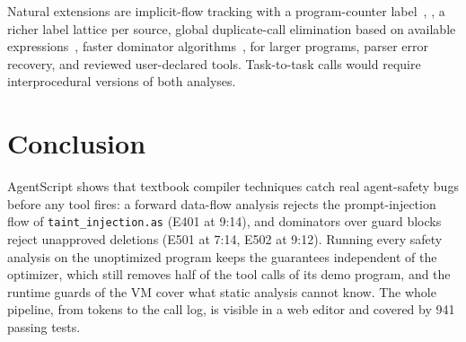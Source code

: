 \documentclass[conference]{IEEEtran}
\begin{document}
Natural extensions are implicit-flow tracking with a program-counter label~\cite{denning}, \cite{sabelfeld}, a richer label lattice per source, global duplicate-call elimination based on available expressions~\cite{aho}, faster dominator algorithms~\cite{lt}, \cite{cooper} for larger programs, parser error recovery, and reviewed user-declared tools. Task-to-task calls would require interprocedural versions of both analyses.

\section{Conclusion}
AgentScript shows that textbook compiler techniques catch real agent-safety bugs before any tool fires: a forward data-flow analysis rejects the prompt-injection flow of \texttt{taint\_injection.as} (E401 at 9:14), and dominators over guard blocks reject unapproved deletions (E501 at 7:14, E502 at 9:12). Running every safety analysis on the unoptimized program keeps the guarantees independent of the optimizer, which still removes half of the tool calls of its demo program, and the runtime guards of the VM cover what static analysis cannot know. The whole pipeline, from tokens to the call log, is visible in a web editor and covered by 941 passing tests.
\end{document}
